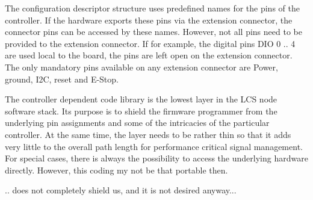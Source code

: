The configuration descriptor structure uses predefined names for the pins of the controller. If the hardware exports these pins via the extension connector, the connector pins can be accessed by these names. However, not all pins need to be provided to the extension connector. If for example, the digital pins DIO 0 .. 4 are used local to the board, the pins are left open on the extension connector. The only mandatory pins available on any extension connector are Power, ground, I2C, reset and E-Stop.


The controller dependent code library is the lowest layer in the LCS node software stack. Its purpose is to shield the firmware programmer from the underlying pin assignments and some of the intricacies of the particular controller. At the same time, the layer needs to be rather thin so that it adds very little to the overall path length for performance critical signal management. For special cases, there is always the possibility to access the underlying hardware directly. However, this coding my not be that portable then.

.. does not completely shield us, and it is not desired anyway...

